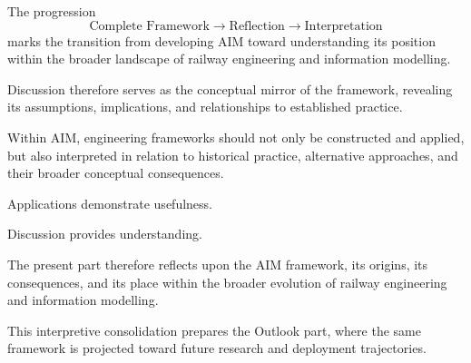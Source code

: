 The progression
\[
\text{Complete Framework}
\rightarrow
\text{Reflection}
\rightarrow
\text{Interpretation}
\]
marks the transition from developing AIM toward understanding its
position within the broader landscape of railway engineering and
information modelling.

Discussion therefore serves as the conceptual mirror of the framework,
revealing its assumptions, implications, and relationships to
established practice.

\begin{principle}
\label{princ:interpretation-principle}
Within AIM, engineering frameworks should not only be constructed and
applied, but also interpreted in relation to historical practice,
alternative approaches, and their broader conceptual consequences.
\end{principle}

\begin{summary}
Applications demonstrate usefulness.

Discussion provides understanding.

The present part therefore reflects upon the AIM framework, its
origins, its consequences, and its place within the broader evolution
of railway engineering and information modelling.
\end{summary}

This interpretive consolidation prepares the Outlook part, where the
same framework is projected toward future research and deployment
trajectories.

